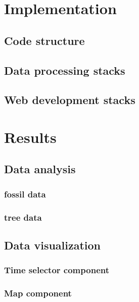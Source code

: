 \documentclass[11pt, a4paper,oneside,chapterprefix=false]{scrbook}
\begin{document}
\chapter{Implementation} \label{chp:implementation}
\section{Code structure} \label{sec:implementation_code_structure}
\section{Data processing stacks}\label{sec:implementation_data_processing}
\section{Web development stacks}\label{sec:implementation_web_development}

\chapter{Results} \label{chp:results}
\section{Data analysis} \label{sec:result_data_analysis}
\subsection{fossil data} \label{subsec:data_analysis_fossil}
\subsection{tree data} \label{subsec:data_analysis_tree}

\section{Data visualization} \label{sec:result_data_visualization}
\subsection{Time selector component} \label{subsec:data_visualization_time}
\subsection{Map component} \label{subsec:data_visualization_map}
\end{document}
